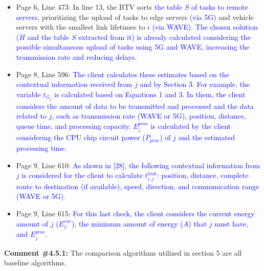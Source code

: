 \begin{itemize}
    \item Page 6, Line 473: In line 13, the BTV sorts \textcolor{blue}{the table $S$ of tasks to remote servers}, prioritizing the upload of tasks to edge servers \textcolor{blue}{(via 5G)} and vehicle servers with the smallest link lifetimes to $i$ \textcolor{blue}{(via WAVE)}. \textcolor{blue}{The chosen solution ($H$ and the table $S$ extracted from it) is already calculated considering the possible simultaneous upload of tasks using 5G and WAVE, increasing the transmission rate and reducing delays.}
    \item Page 8, Line 596: \textcolor{blue}{The client calculates these estimates based on the contextual information received from $j$ and by Section 3. For example, the variable $t_{G_j}$ is calculated based on Equations 1 and 3. In them, the client considers the amount of data to be transmitted and processed and the data related to $j$, such as transmission rate (WAVE or 5G), position, distance, queue time, and processing capacity. $E^{proc}_{j}$ is calculated by the client considering the CPU chip circuit power ($P_{proc}$) of $j$ and the estimated processing time.}
    \item Page 9, Line 610: \textcolor{blue}{As shown in [28], the following contextual information from $j$ is considered for the client to calculate $t^{link}_{i,j}$: position, distance, complete route to destination (if available), speed, direction, and communication range (WAVE or 5G).}
    \item Page 9, Line 615: \textcolor{blue}{For this last check, the client considers the current energy amount of $j$ ($E^{cur}_{j}$), the minimum amount of energy ($A$) that $j$ must have, and $E^{proc}_{j}$.}
\end{itemize}

\vspace{\baselineskip}

\begin{mdframed}[style=review] 
\textbf{Comment \#4.5.1:} The comparison algorithms utilized in section 5 are all baseline algorithms.
\end{mdframed}

